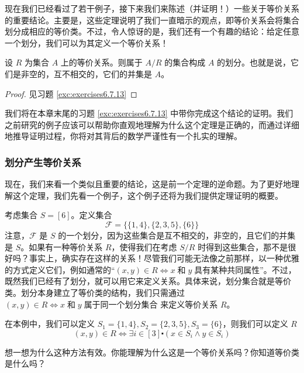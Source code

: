 现在我们已经看过了若干例子，接下来我们来陈述（并证明！）一些关于等价关系的重要结论。主要是，这些定理说明了我们一直暗示的观点，即等价关系会将集合划分成相应的等价类。不过，令人惊讶的是，我们还有一个有趣的结论：给定任意一个划分，我们可以为其定义一个等价关系！

\begin{theorem}\label{theorem6.4.10}
    设 $R$ 为集合 $A$ 上的等价关系。则属于 $A/R$ 的集合构成 $A$ 的划分。也就是说，它们是非空的，互不相交的，它们的并集是 $A$。
\end{theorem}

\begin{proof}
    见习题 \ref{exc:exercises6.7.13}
\end{proof}

我们将在本章末尾的习题 \ref{exc:exercises6.7.13} 中带你完成这个结论的证明。我们之前研究的例子应该可以帮助你直观地理解为什么这个定理是正确的，而通过详细地推导证明过程，你将对其背后的数学严谨性有一个扎实的理解。

\subsubsection*{划分产生等价关系}

现在，我们来看一个类似且重要的结论，这是前一个定理的逆命题。为了更好地理解这个定理，我们先看一个例子，这个例子还将为我们提供定理证明的概要。\\

\begin{example}
    考虑集合 $S=[6]$。定义集合
    \[\mathcal{F} = \{ \{1, 4\}, \{2, 3, 5\} , \{6\} \}\]
    注意，$\mathcal{F}$ 是 $S$ 的一个划分，因为这些集合是互不相交的，非空的，且它们的并集是 $S$。如果有一种等价关系 $R$，使得我们在考虑 $S/R$ 时得到这些集合，那不是很好吗？事实上，确实存在这样的关系！尽管我们可能无法像之前那样，以一种优雅的方式定义它们，例如通常的``$(x, y) \in R \iff x \;\text{和}\; y \;\text{具有某种共同属性}$''。不过，既然我们已经有了划分，就可以用它来定义关系。具体来说，划分集合就是等价类。划分本身建立了等价类的结构，我们只需通过 $(x, y) \in R \iff x \;\text{和}\; y \;\text{属于同一个划分集合}$ 来定义等价关系 $R$。

    在本例中，我们可以定义 $S_1 = \{1, 4\} , S_2 = \{2, 3, 5\} , S_3 = \{6\}$，则我们可以定义 $R$
    \[(x, y) \in R \iff \exists i \in [3] \centerdot (x \in S_i \land y \in S_i)\]
\end{example}

想一想为什么这种方法有效。你能理解为什么这是一个等价关系吗？你知道等价类是什么吗？

